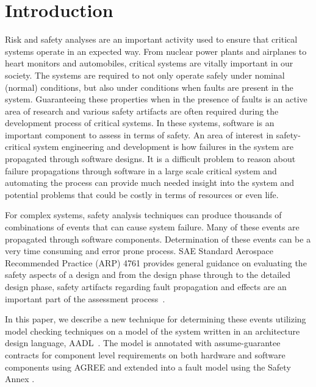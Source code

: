 \section{Introduction}
\label{sec:intro}

Risk and safety analyses are an important activity used to ensure that critical systems operate in an expected way. From nuclear power plants and airplanes to heart monitors and automobiles, critical systems are vitally important in our society. The systems are required to not only operate safely under nominal (normal) conditions, but also under conditions when faults are present in the system. Guaranteeing these properties when in the presence of faults is an active area of research and various safety artifacts are often required during the development process of critical systems. In these systems, software is an important component to assess in terms of safety. An area of interest in safety-critical system engineering and development is how failures in the system are propagated through software designs. It is a difficult problem to reason about failure propagations through software in a large scale critical system and automating the process can provide much needed insight into the system and potential problems that could be costly in terms of resources or even life. 

 For complex systems, safety analysis techniques can produce thousands of combinations of events that can cause system failure. Many of these events are propagated through software components. Determination of these events can be a very time consuming and error prone process. SAE Standard Aerospace Recommended Practice (ARP) 4761 provides general guidance on evaluating the safety aspects of a design and from the design phase through to the detailed design phase, safety artifacts regarding fault propagation and effects are an important part of the assessment process~\cite{SAE:ARP4761}. 

In this paper, we describe a new technique for determining these events utilizing model checking techniques on a model of the system written in an architecture design language, AADL~\cite{AADL_Standard}. The model is annotated with assume-guarantee contracts for component level requirements on both hardware and software components using AGREE and extended into a fault model using the Safety Annex \cite{Stewart17:IMBSA,SATechReport,QFCS15:backes}. 

